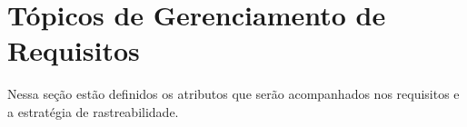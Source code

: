 \chapter[Tópicos de Gerenciamento de Requisitos]{Tópicos de Gerenciamento de Requisitos}

Nessa seção estão definidos os atributos que serão acompanhados nos requisitos e a estratégia de rastreabilidade.



